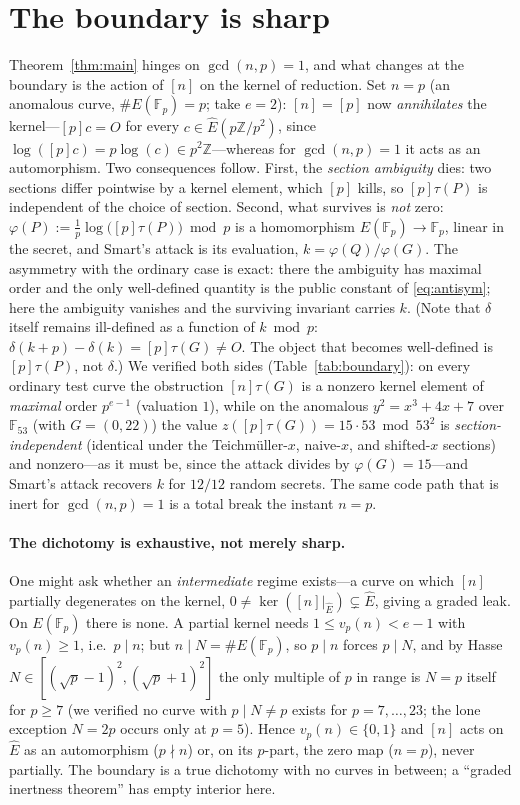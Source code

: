 \documentclass[11pt]{article}
\theoremstyle{definition}
\newcommand{\Fp}{\mathbb{F}_p}
\newcommand{\Z}{\mathbb{Z}}
\newcommand{\Ehat}{\widehat{E}}
\begin{document}
\section{The boundary is sharp}\label{sec:boundary}

Theorem~\ref{thm:main} hinges on $\gcd(n,p)=1$, and what changes at the
boundary is the action of $[n]$ on the kernel of reduction. Set $n=p$ (an
anomalous curve, $\#E(\Fp)=p$; take $e=2$): $[n]=[p]$ now
\emph{annihilates} the kernel---$[p]c=O$ for every
$c\in\Ehat(p\Z/p^2)$, since $\log([p]c)=p\log(c)\in p^2\Z$---whereas for
$\gcd(n,p)=1$ it acts as an automorphism. Two consequences follow. First,
the \emph{section ambiguity} dies: two sections differ pointwise by a
kernel element, which $[p]$ kills, so $[p]\tau(P)$ is independent of the
choice of section. Second, what survives is \emph{not} zero:
$\varphi(P):=\tfrac1p\log\!\big([p]\tau(P)\big)\bmod p$ is a homomorphism
$E(\Fp)\to\Fp$, linear in the secret, and Smart's attack is its
evaluation, $k=\varphi(Q)/\varphi(G)$. The asymmetry with the ordinary
case is exact: there the ambiguity has maximal order and the only
well-defined quantity is the public constant of \eqref{eq:antisym}; here
the ambiguity vanishes and the surviving invariant carries $k$. (Note
that $\delta$ itself remains ill-defined as a function of $k\bmod p$:
$\delta(k+p)-\delta(k)=[p]\tau(G)\neq O$. The object that becomes
well-defined is $[p]\tau(P)$, not $\delta$.) We verified both sides
(Table~\ref{tab:boundary}): on every ordinary test curve the obstruction
$[n]\tau(G)$ is a nonzero kernel element of \emph{maximal} order
$p^{e-1}$ (valuation $1$), while on the anomalous $y^2=x^3+4x+7$ over
$\mathbb F_{53}$ (with $G=(0,22)$) the value
$z([p]\tau(G))=15\cdot 53\bmod 53^2$ is \emph{section-independent}
(identical under the Teichm\"uller-$x$, naive-$x$, and shifted-$x$
sections) and nonzero---as it must be, since the attack divides by
$\varphi(G)=15$---and Smart's attack recovers $k$ for $12/12$ random
secrets. The same code path that is inert for $\gcd(n,p)=1$ is a total
break the instant $n=p$.

\paragraph{The dichotomy is exhaustive, not merely sharp.} One might ask
whether an \emph{intermediate} regime exists---a curve on which $[n]$
partially degenerates on the kernel, $0\neq\ker([n]|_{\Ehat})\subsetneq
\Ehat$, giving a graded leak. On $E(\Fp)$ there is none. A partial kernel
needs $1\le v_p(n)<e-1$ with $v_p(n)\ge1$, i.e.\ $p\mid n$; but $n\mid
N=\#E(\Fp)$, so $p\mid n$ forces $p\mid N$, and by Hasse
$N\in[(\sqrt p-1)^2,(\sqrt p+1)^2]$ the only multiple of $p$ in range is
$N=p$ itself for $p\ge7$ (we verified no curve with $p\mid N\neq p$
exists for $p=7,\dots,23$; the lone exception $N=2p$ occurs only at
$p=5$). Hence $v_p(n)\in\{0,1\}$ and $[n]$ acts on $\Ehat$ as an
automorphism ($p\nmid n$) or, on its $p$-part, the zero map ($n=p$),
never partially. The boundary is a true dichotomy with no curves in
between; a ``graded inertness theorem'' has empty interior here.
\end{document}

